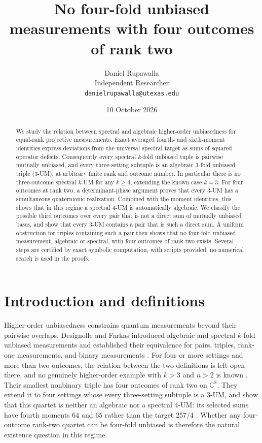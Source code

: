 \documentclass[11pt]{article}
\title{No four-fold unbiased measurements with four outcomes of rank two}
\author{Daniel Rupawalla\\ Independent Researcher\\ \texttt{danielrupawalla@utexas.edu}}
\date{10 October 2026}
\begin{document}
\maketitle
\begin{abstract}
We study the relation between spectral and algebraic higher-order
unbiasedness for equal-rank projective measurements. Exact averaged
fourth- and sixth-moment identities express deviations from the universal
spectral target as sums of squared operator defects. Consequently every
spectral $k$-fold unbiased tuple is pairwise mutually unbiased, and every
three-setting subtuple is an algebraic 3-fold unbiased triple (3-UM), at
arbitrary finite rank and outcome number. In particular there is no
three-outcome spectral $k$-UM for any $k\geq4$, extending the known
case $k=3$.
For four outcomes at rank two, a determinant-phase argument proves that
every 3-UM has a simultaneous quaternionic realization. Combined with the
moment identities, this shows that in this regime a spectral 4-UM is
automatically algebraic. We classify the possible third outcomes over every
pair that is not a direct sum of mutually unbiased bases, and show that
every 3-UM contains a pair that is such a direct sum. A uniform obstruction
for triples containing such a pair then shows that no four-fold unbiased
measurement, algebraic or spectral, with four outcomes of rank two exists.
Several steps are certified by exact symbolic computation, with scripts
provided; no numerical search is used in the proofs.
\end{abstract}

\section{Introduction and definitions}
Higher-order unbiasedness constrains quantum measurements beyond their
pairwise overlaps. Designolle and Farkas introduced algebraic and spectral
$k$-fold unbiased measurements and established their equivalence for pairs,
triples, rank-one measurements, and binary measurements \cite[Thm.~3]{DF}.
For four or more settings and more than two outcomes, the relation
between the two definitions is left open there, and no genuinely
higher-order example with $k>3$ and $n>2$ is known \cite[Sec.~VI]{DF}.
Their smallest nonbinary triple has four outcomes of rank two on
$\mathbb C^8$. They extend it to four settings whose every three-setting
subtuple is a 3-UM, and show that this quartet is neither an algebraic nor
a spectral 4-UM: its selected sums have fourth moments $64$ and $65$
rather than the target $257/4$ \cite[App.~C]{DF}. Whether any
four-outcome rank-two quartet can be four-fold unbiased is therefore the
natural existence question in this regime.
\end{document}
